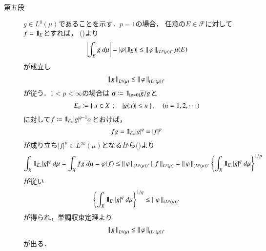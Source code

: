 \begin{prf}
\begin{description}
			\item[第五段]
				$g \in L^q(\mu)$であることを示す．$p = 1$の場合，
				任意の$E \in \mathscr{F}$に対して$f = \mbox{1}\hspace{-0.25em}\mbox{l}_E$とすれば，
				()より
				\begin{align}
					\left| \int_E g\ d\mu \right| = \left| \varphi(\mbox{1}\hspace{-0.25em}\mbox{l}_E) \right|
					\leq \left\|\, \varphi\, \right\|_{\left( L^p(\mu) \right)^*} \mu(E)
				\end{align}
				が成立し
				\begin{align}
					\left\|\, g\, \right\|_{L^q(\mu)} \leq \left\|\, \varphi\, \right\|_{\left( L^p(\mu) \right)^*}
					\label{eq:thm_dual_space_of_L_p_4}
				\end{align}
				が従う．$1 < p < \infty$の場合は
				$\alpha \coloneqq \mbox{1}\hspace{-0.25em}\mbox{l}_{\{g \neq 0\}}\overline{g}/g$と
				\begin{align}
					E_n \coloneqq \left\{\ x \in X\ \, ; \quad |g(x)| \leq n\ \right\},
					\quad (n=1,2,\cdots)
				\end{align}
				に対して$f \coloneqq \mbox{1}\hspace{-0.25em}\mbox{l}_{E_n} |g|^{q-1} \alpha$とおけば，
				\begin{align}
					fg = \mbox{1}\hspace{-0.25em}\mbox{l}_{E_n} |g|^q = |f|^p
				\end{align}
				が成り立ち$|f|^p \in L^\infty(\mu)$となるから()より
				\begin{align}
					\int_X \mbox{1}\hspace{-0.25em}\mbox{l}_{E_n} |g|^q\ d\mu
					= \int_X fg\ d\mu
					= \varphi(f)
					\leq \left\|\, \varphi\, \right\|_{\left( L^p(\mu) \right)^*} \left\|\, f\, \right\|_{L^p(\mu)}
					= \left\|\, \varphi\, \right\|_{\left( L^p(\mu) \right)^*} \left\{ \int_X \mbox{1}\hspace{-0.25em}\mbox{l}_{E_n} |g|^q\ d\mu \right\}^{1/p}
				\end{align}
				が従い
				\begin{align}
					\left\{ \int_X \mbox{1}\hspace{-0.25em}\mbox{l}_{E_n} |g|^q\ d\mu \right\}^{1/q} \leq \left\|\, \varphi\, \right\|_{\left( L^p(\mu) \right)^*}
				\end{align}
				が得られ，単調収束定理より
				\begin{align}
					\left\|\, g\, \right\|_{L^q(\mu)} \leq \left\|\, \varphi\, \right\|_{\left( L^p(\mu) \right)^*}
					\label{eq:thm_dual_space_of_L_p_5}
				\end{align}
				が出る．
				

\end{description}
\end{prf}
